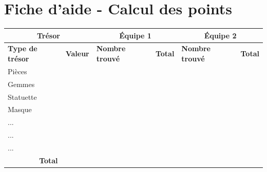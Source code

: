 \documentclass{pirategame}
\begin{document}
\newpage

\section*{Fiche d'aide - Calcul des points}

\begin{center}
  \renewcommand{\arraystretch}{1.5}
  \begin{tabular}{|p{3cm}|p{2cm}|p{2cm}|p{2cm}|p{2cm}|p{2cm}|}
    \hline
    \multicolumn{2}{|c|}{\textbf{Trésor}} & \multicolumn{2}{c|}{\textbf{Équipe 1}} & \multicolumn{2}{c|}{\textbf{Équipe 2}} \\ \hline
    \textbf{Type de trésor} & \textbf{Valeur} & \textbf{Nombre trouvé} & \textbf{Total} & \textbf{Nombre trouvé} & \textbf{Total} \\ \hline
    Pièces                 &                 &                         &                &                         &                \\ \hline
    Gemmes                 &                 &                         &                &                         &                \\ \hline
    Statuette              &                 &                         &                &                         &                \\ \hline
    Masque                 &                 &                         &                &                         &                \\ \hline
    ...                  &                 &                         &                &                         &                \\ \hline
    ...                  &                 &                         &                &                         &                \\ \hline
    ...                  &                 &                         &                &                         &                \\ \hline
    \multicolumn{2}{|c|}{\textbf{Total}}    &                         &                &                         &                \\ \hline
  \end{tabular}
  \bigskip


\end{center}
\end{document}
